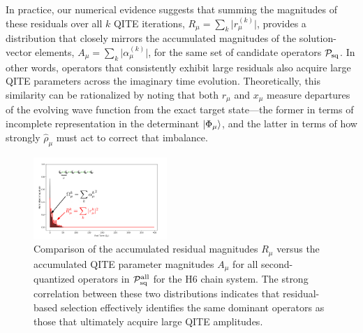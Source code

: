 \documentclass[aip,jcp,amsmath,amssymb, reprint]{revtex4-1}
\begin{document}
In practice, our numerical evidence suggests that summing the magnitudes of these residuals over all $k$ QITE iterations, 
$R_\mu = \sum_{k} \bigl|r_\mu^{(k)}\bigr|$,
provides a distribution that closely mirrors the accumulated magnitudes of the solution-vector elements,
$A_\mu = \sum_{k} \bigl| \alpha_\mu^{(k)}\bigr|$,
for the same set of candidate operators $\mathcal{P}_{\rm{sq}}$. In other words, operators that consistently exhibit large residuals also acquire large QITE parameters across the imaginary time evolution. Theoretically, this similarity can be rationalized by noting that both $r_\mu$ and $x_\mu$ measure departures of the evolving wave function from the exact target state---the former in terms of incomplete representation in the determinant $\ket{\Phi_\mu}$, and the latter in terms of how strongly $\hat{\rho}_\mu$ must act to correct that imbalance.

\begin{figure}[h!]
\centering
\includegraphics[width=0.45\textwidth]{sqite_paper/full_pool_plot.png}
\caption{Comparison of the accumulated residual magnitudes $R_\mu$ versus the accumulated QITE parameter magnitudes $A_\mu$ for all second-quantized operators in $\mathcal{P}_{\rm{sq}}^{\rm{all}}$ for the H6 chain system. The strong correlation between these two distributions indicates that residual-based selection effectively identifies the same dominant operators as those that ultimately acquire large QITE amplitudes.}
\label{fig:residual_param_comparison}
\end{figure}

\end{document}
